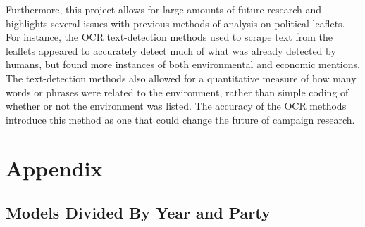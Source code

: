 \documentclass[12pt,letterpaper]{article}
\begin{document}
Furthermore, this project allows for large amounts of future research and highlights several issues with previous methods of analysis on political leaflets. For instance, the OCR text-detection methods used to scrape text from the leaflets appeared to accurately detect much of what was already detected by humans, but found more instances of both environmental and economic mentions. The text-detection methods also allowed for a quantitative measure of how many words or phrases were related to the environment, rather than simple coding of whether or not the environment was listed. The accuracy of the OCR methods introduce this method as one that could change the future of campaign research.

 



\newpage


\section{Appendix}

\subsection{ Models Divided By Year and Party}

\end{document}
